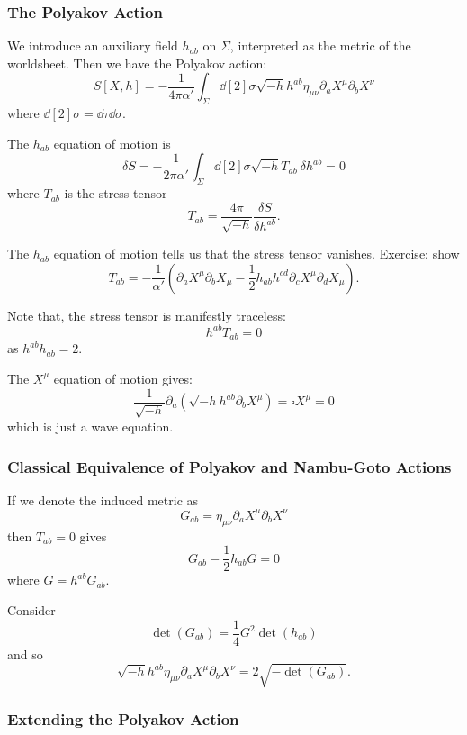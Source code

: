 \documentclass[a4paper,11pt]{article}
\begin{document}
	\subsubsection{The Polyakov Action}

	We introduce an auxiliary field $h _{a b}$ on $\Sigma$, interpreted as the metric of the worldsheet. Then we have the Polyakov action:
	\[
		\boxed{S[X,h] = - \frac{1}{4 \pi \alpha'} \int_\Sigma \dd[2]{\sigma} \sqrt{- h } h ^{a b} \eta _{\mu \nu} \partial_a X^\mu \partial_b X^\nu}
	\]
	where $\dd[2]{\sigma} = \dd{\tau} \dd{\sigma}$.

	The $h _{a b}$ equation of motion is 
	\[
		\delta S = - \frac{1}{2 \pi \alpha'} \int_\Sigma \dd[2]{\sigma} \sqrt{- h } T _{a b}\ \delta h ^{a b} = 0
	\]
	where $T _{a b}$ is the stress tensor
	\[
		T _{a b} = \frac{4 \pi}{\sqrt{- h}} \frac{\delta S}{\delta h ^{a b}}.
	\]

	The $h _{a b}$ equation of motion tells us that the stress tensor vanishes. Exercise: show
	\[
		T _{a b} = - \frac{1}{\alpha'} \left( \partial_a X^\mu \partial_b X_\mu - \frac{1}{2} h _{a b} h ^{c d} \partial_c X^\mu \partial_d X_\mu \right).
	\]
	
	Note that, the stress tensor is manifestly traceless:
	\[
		h ^{a b}T _{a b} = 0
	\]
	as $h ^{a b} h _{a b} = 2$.

	The $X^\mu$ equation of motion gives:
	\[
		\frac{1}{\sqrt{- h }} \partial_a \left( \sqrt{- h}h ^{a b} \partial_b X^\mu \right) = \square X^\mu = 0
	\]
	which is just a wave equation.

	\subsubsection{Classical Equivalence of Polyakov and Nambu-Goto Actions}

	If we denote the induced metric as 
	\[
		G _{a b} = \eta _{\mu \nu} \partial_a X^\mu \partial_b X^\nu
	\]
	then $T _{a b} = 0$ gives
	\[
		G _{a b} - \frac{1}{2} h _{a b}G = 0
	\]
	where $G = h ^{a b} G _{a b}$.
	
	Consider 
	\[
		\det (G _{ab}) = \frac{1}{4} G^2 \det (h _{a b})
	\]
	and so
	\[
		\sqrt{- h} h ^{a b} \eta _{ \mu \nu} \partial_a X^\mu \partial_b X^\nu = 2 \sqrt{ - \det(G _{a b})}.
	\]

	\subsubsection{Extending the Polyakov Action}
\end{document}
